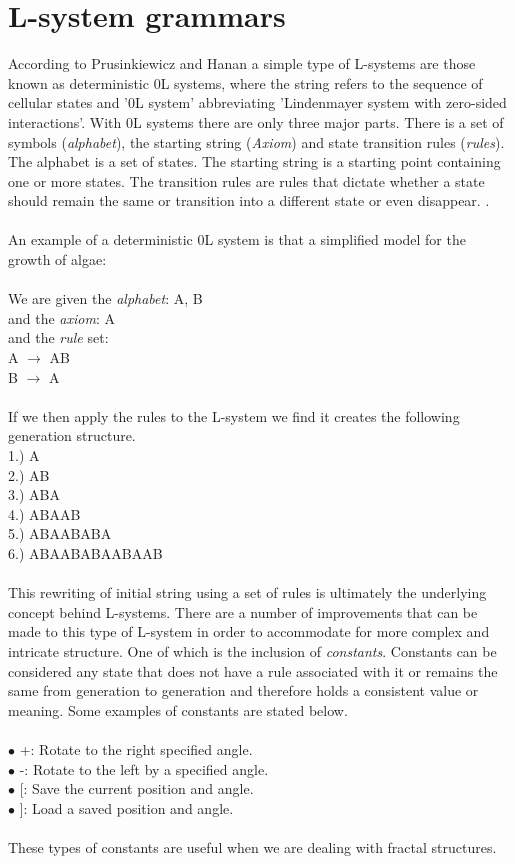 \section{L-system grammars}

According to Prusinkiewicz and Hanan a simple type of L-systems are those known as deterministic 0L systems, where the string refers to the sequence of cellular states and '0L system' abbreviating 'Lindenmayer system with zero-sided interactions'.  With 0L systems there are only three major parts. There is a set of symbols (\textit{alphabet}), the starting string (\textit{Axiom}) and state transition rules (\textit{rules}). The alphabet is a set of states. The starting string is a starting point containing one or more states. The transition rules are rules that dictate whether a state should remain the same or transition into a different state or even disappear. \cite{prusinkiewicz2013lindenmayer}. \\
\\
An example of a deterministic 0L system is that a simplified model for the growth of algae: \\
\\
We are given the \textit{alphabet}: A, B \\ 
and the \textit{axiom}: A \\
and the \textit{rule} set: \\ 
A $\rightarrow$ AB \\
B $\rightarrow$ A \\
\\
If we then apply the rules to the L-system we find it creates the following generation structure. \\
1.) A \\
2.) AB \\
3.) ABA \\
4.) ABAAB \\
5.) ABAABABA \\
6.) ABAABABAABAAB \\
\\
This rewriting of initial string using a set of rules is ultimately the underlying concept behind L-systems. There are a number of improvements that can be made to this type of L-system in order to accommodate for more complex and intricate structure. One of which is the inclusion of \textit{constants}. Constants can be considered any state that does not have a rule associated with it or remains the same from generation to generation and therefore holds a consistent value or meaning. Some examples of constants are stated below. \\
\\
$\bullet$ +: Rotate to the right specified angle. \\
$\bullet$ -: Rotate to the left by a specified angle.  \\
$\bullet$ [: Save the current position and angle. \\
$\bullet$ ]: Load a saved position and angle. \\
\\
These types of constants are useful when we are dealing with fractal structures.

